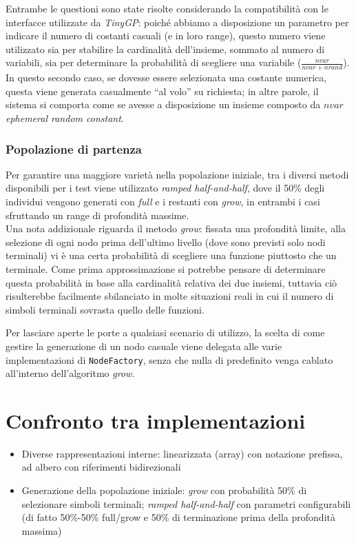 \documentclass{../llncs}
\begin{document}
Entrambe le questioni sono state risolte considerando la compatibilità con le interfacce utilizzate da \emph{TinyGP}: poiché abbiamo a disposizione un parametro per indicare il numero di costanti casuali (e in loro range), questo numero viene utilizzato sia per stabilire la cardinalità dell'insieme, sommato al numero di variabili, sia per determinare la probabilità di scegliere una variabile ($\frac{nvar}{nvar+nrand}$). In questo secondo caso, se dovesse essere selezionata una costante numerica, questa viene generata casualmente ``al volo'' su richiesta; in altre parole, il sistema si comporta come se avesse a disposizione un insieme composto da $nvar$ \emph{ephemeral random constant}.

\subsubsection{Popolazione di partenza}
Per garantire una maggiore varietà nella popolazione iniziale, tra i diversi metodi disponibili per i test viene utilizzato \emph{ramped half-and-half}, dove il 50\% degli individui vengono generati con \emph{full} e i restanti con \emph{grow}, in entrambi i casi sfruttando un range di profondità massime.\\

Una nota addizionale riguarda il metodo \emph{grow}: fissata una profondità limite, alla selezione di ogni nodo prima dell'ultimo livello (dove sono previsti solo nodi terminali) vi è una certa probabilità di scegliere una funzione piuttosto che un terminale. Come prima approssimazione si potrebbe pensare di determinare questa probabilità in base alla cardinalità relativa dei due insiemi, tuttavia ciò risulterebbe facilmente sbilanciato in molte situazioni reali in cui il numero di simboli terminali sovrasta quello delle funzioni.

Per lasciare aperte le porte a qualsiasi scenario di utilizzo, la scelta di come gestire la generazione di un nodo casuale viene delegata alle varie implementazioni di \texttt{NodeFactory}, senza che nulla di predefinito venga cablato all'interno dell'algoritmo \emph{grow}.

\section{Confronto tra implementazioni}
\begin{itemize}
\item Diverse rappresentazioni interne: linearizzata (array) con notazione prefissa, ad albero con riferimenti bidirezionali
\item Generazione della popolazione iniziale: \emph{grow} con probabilità 50\% di selezionare simboli terminali; \emph{ramped half-and-half} con parametri configurabili (di fatto 50\%-50\% full/grow e 50\% di terminazione prima della profondità massima)
\end{itemize}
\end{document}
